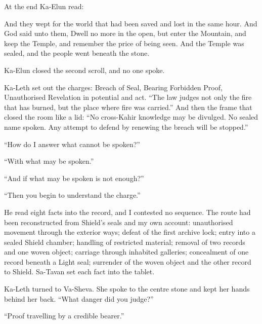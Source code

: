 At the end Ka-Elun read:\par

\begin{scripture}
And they wept for the world that had been saved and lost in the same hour. And God said unto them, Dwell no more in the open, but enter the Mountain, and keep the Temple, and remember the price of being seen. And the Temple was sealed, and the people went beneath the stone.
\end{scripture}

Ka-Elun closed the second scroll, and no one spoke.\par

Ka-Leth set out the charges: Breach of Seal, Bearing Forbidden Proof, Unauthorised Revelation in potential and act. ``The law judges not only the fire that has burned, but the place where fire was carried.'' And then the frame that closed the room like a lid: ``No cross-Kahir knowledge may be divulged. No sealed name spoken. Any attempt to defend by renewing the breach will be stopped.''\par

``How do I answer what cannot be spoken?''\par

``With what may be spoken.''\par

``And if what may be spoken is not enough?''\par

``Then you begin to understand the charge.''\par

He read eight facts into the record, and I contested no sequence. The route had been reconstructed from Shield's seals and my own account: unauthorised movement through the exterior ways; defeat of the first archive lock; entry into a sealed Shield chamber; handling of restricted material; removal of two records and one woven object; carriage through inhabited galleries; concealment of one record beneath a Light seal; surrender of the woven object and the other record to Shield. Sa-Tavan set each fact into the tablet.\par

Ka-Leth turned to Va-Sheva. She spoke to the centre stone and kept her hands behind her back. ``What danger did you judge?''\par

``Proof travelling by a credible bearer.''\par

